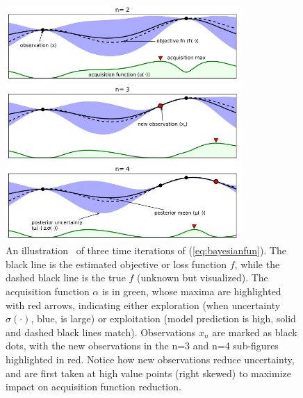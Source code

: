 \begin{figure}[ht!]
	\centering	\includegraphics[width=0.8\textwidth,keepaspectratio]{figs/bayesian.png}
    \caption{An illustration~\cite{bayesian} of three time iterations of (\ref{eq:bayesianfun}). The black line is the estimated objective or loss function $f$, while the dashed black line is the true $f$ (unknown but visualized). The acquisition function $\alpha$ is in green, whose maxima are highlighted with red arrows, indicating either exploration (when uncertainty $\sigma(\cdot)$, blue, is large) or exploitation (model prediction is high, solid and dashed black lines match). Observations $x_n$ are marked as black dots, with the new observations in the n=3 and n=4 sub-figures highlighted in red. Notice how new observations reduce uncertainty, and are first taken at high value points (right skewed) to maximize impact on acquisition function reduction.}
\label{fig:bayesianill}      
\end{figure}

